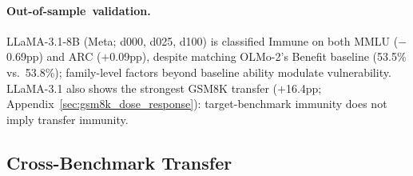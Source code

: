 \paragraph{Out-of-sample~validation.}
LLaMA-3.1-8B (Meta; d000, d025, d100) is classified Immune on both MMLU ($-$0.69pp) and ARC ($+$0.09pp), despite matching OLMo-2's Benefit baseline (53.5\% vs.\ 53.8\%); family-level factors beyond baseline ability modulate vulnerability. LLaMA-3.1 also shows the strongest GSM8K transfer ($+$16.4pp; Appendix~\ref{sec:gsm8k_dose_response}): target-benchmark immunity does not imply transfer immunity.

\subsection{Cross-Benchmark Transfer}
\label{sec:gsm8k_transfer}

\begin{table}[t]
\centering
\caption{Cross-benchmark transfer: MMLU vs.\ GSM8K accuracy change at d100. LLaMA-3.1 shows the strongest asymmetric transfer ($+$16.4pp GSM8K despite MMLU immunity). Gemma-2 excluded due to CoT collapse under MC-format SFT.}
\label{tab:gsm8k_transfer}
\footnotesize
{}
\end{table}

